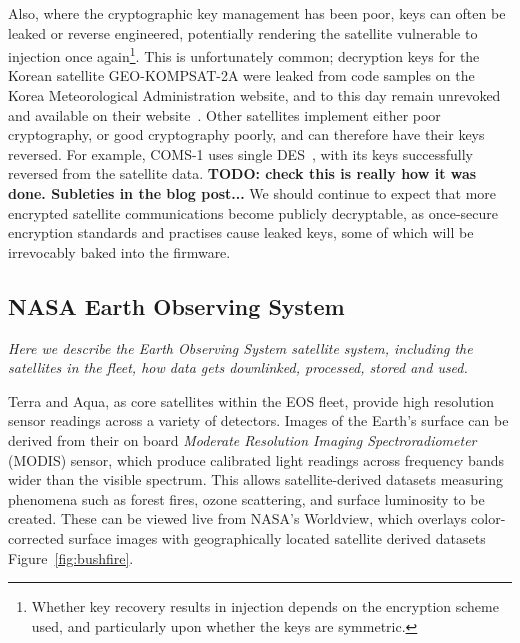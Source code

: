 Also, where the cryptographic key management has been poor, keys can often be leaked or reverse engineered, potentially rendering the satellite vulnerable to injection once again\footnote{Whether key recovery results in injection depends on the encryption scheme used, and particularly upon whether the keys are symmetric.}.
This is unfortunately common; decryption keys for the Korean satellite GEO-KOMPSAT-2A were leaked from code samples on the Korea Meteorological Administration website, and to this day remain unrevoked and available on their website~\cite{xrit-rx}.
Other satellites implement either poor cryptography, or good cryptography poorly, and can therefore have their keys reversed.
For example, COMS-1 uses single DES~\cite{lrit-key-dec}, with its keys successfully reversed from the satellite data. \textbf{TODO: check this is really how it was done. Subleties in the blog post...}
We should continue to expect that more encrypted satellite communications become publicly decryptable, as once-secure encryption standards and practises cause leaked keys, some of which will be irrevocably baked into the firmware.


\subsection{NASA Earth Observing System}


\textit{Here we describe the Earth Observing System satellite system, including the satellites in the fleet, how data gets downlinked, processed, stored and used.}

Terra and Aqua, as core satellites within the EOS fleet, provide high resolution sensor readings across a variety of detectors.
Images of the Earth's surface can be derived from their on board \textit{Moderate Resolution Imaging Spectroradiometer} (MODIS) sensor, which produce calibrated light readings across frequency bands wider than the visible spectrum.
This allows satellite-derived datasets measuring phenomena such as forest fires, ozone scattering, and surface luminosity to be created.
These can be viewed live from NASA's Worldview, which overlays color-corrected surface images with geographically located satellite derived datasets Figure~\ref{fig:bushfire}.

